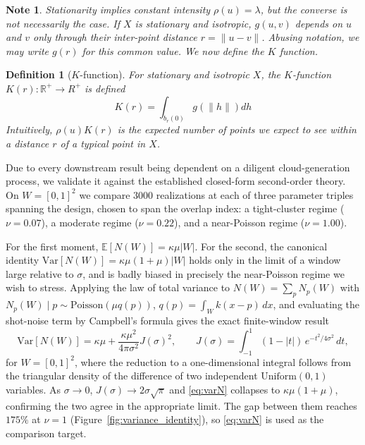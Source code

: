 \documentclass[11pt,letterpaper]{article}
\newcommand{\R}{\mathbb{R}}
\newcommand{\1}{\mathds{1}}
\theoremstyle{plain}
\theoremstyle{definitioncolon}
\newtheorem{definition}[theorem]{Definition}
\newtheorem*{note}{Note}
\begin{document}
    \begin{note}
        Stationarity implies constant intensity $\rho(u) = \lambda$, but the
        converse is not necessarily the case. If $X$ is stationary and isotropic,
        $g(u, v)$ depends on $u$ and $v$ only through their inter-point distance
        $r = \|u - v\|$. Abusing notation, we may write $g(r)$ for this common
        value. We now define the $K$ function.
    \end{note}

    \begin{definition}[$K$-function]
        For stationary and isotropic $X$, the $K$-function
        $K(r): \R^+ \rightarrow R^+$ is defined
            \[
            K(r) = \int_{b_r(0)} g(\|h\|) dh
            \]
        Intuitively, $\rho(u)K(r)$ is the expected number of points we expect to
        see within a distance $r$ of a typical point in $X$.
    \end{definition}

Due to every downstream result being dependent on a diligent cloud-generation
process, we validate it against the established closed-form second-order theory.
On $W = [0,1]^2$ we compare $3000$ realizations at each of three parameter
triples spanning the design, chosen to span the overlap index: a tight-cluster
regime ($\nu = 0.07$), a moderate regime ($\nu = 0.22$), and a near-Poisson
regime ($\nu = 1.00$).

For the first moment, $\mathbb{E}[N(W)] = \kappa\mu|W|$. For the second, the
canonical identity $\mathrm{Var}[N(W)] = \kappa\mu(1+\mu)|W|$ holds only in the
limit of a window large relative to $\sigma$, and is badly biased in precisely
the near-Poisson regime we wish to stress. Applying the law of total variance to
$N(W) = \sum_p N_p(W)$ with
$N_p(W) \mid p \sim \mathrm{Poisson}(\mu q(p))$, $q(p) = \int_W k(x-p)\,dx$, and
evaluating the shot-noise term by Campbell's formula gives the exact
finite-window result
    \begin{equation}
    \label{eq:varN}
    \mathrm{Var}[N(W)] = \kappa\mu + \frac{\kappa\mu^2}{4\pi\sigma^2}J(\sigma)^2,
    \qquad
    J(\sigma) = \int_{-1}^{1}(1-|t|)\,e^{-t^2/4\sigma^2}\,dt,
    \end{equation}
for $W = [0,1]^2$, where the reduction to a one-dimensional integral follows from
the triangular density of the difference of two independent
$\mathrm{Uniform}(0,1)$ variables. As $\sigma \to 0$,
$J(\sigma) \to 2\sigma\sqrt{\pi}$ and \eqref{eq:varN} collapses to
$\kappa\mu(1+\mu)$, confirming the two agree in the appropriate limit. The gap
between them reaches $175\%$ at $\nu = 1$ (Figure~\ref{fig:variance_identity}),
so \eqref{eq:varN} is used as the comparison target.
\end{document}
